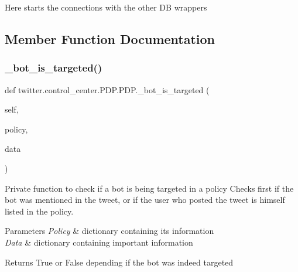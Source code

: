 \begin{DoxyVerb}Here starts the connections with the other DB wrappers
\end{DoxyVerb}
 

\subsection{Member Function Documentation}
\mbox{\label{classtwitter_1_1control__center_1_1PDP_1_1PDP_a302067b5d102cbe2a5f55355bb204333}} 
\subsubsection{\texorpdfstring{\+\_\+bot\+\_\+is\+\_\+targeted()}{\_bot\_is\_targeted()}}
{\footnotesize\ttfamily def twitter.\+control\+\_\+center.\+P\+D\+P.\+P\+D\+P.\+\_\+bot\+\_\+is\+\_\+targeted (\begin{DoxyParamCaption}\item[{}]{self,  }\item[{}]{policy,  }\item[{}]{data }\end{DoxyParamCaption})\hspace{0.3cm}{\ttfamily [private]}}



Private function to check if a bot is being targeted in a policy Checks first if the bot was mentioned in the tweet, or if the user who posted the tweet is himself listed in the policy. 


\begin{DoxyParams}{Parameters}
{\em Policy} & dictionary containing its information \\
\hline
{\em Data} & dictionary containing important information\\
\hline
\end{DoxyParams}
\begin{DoxyReturn}{Returns}
True or False depending if the bot was indeed targeted 
\end{DoxyReturn}
\mbox{\label{classtwitter_1_1control__center_1_1PDP_1_1PDP_a66187cf251e70e9f579406e45eb16137}} 
